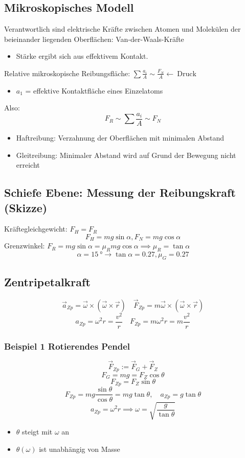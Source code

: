 \documentclass[a4paper]{scrartcl}
\renewcommand{\v}[1]{\vec{#1}}
\theoremstyle{definition}
\theoremstyle{plain}
\theoremstyle{plain}
\theoremstyle{remark}
\theoremstyle{remark}
\theoremstyle{remark}
\begin{document}
\subsection{Mikroskopisches Modell}
\label{sec-3-9}
Verantwortlich sind elektrische Kräfte zwischen Atomen und Molekülen der beieinander liegenden Oberflächen: Van-der-Waals-Kräfte
\begin{itemize}
\item Stärke ergibt sich aus effektivem Kontakt.
\end{itemize}
Relative mikroskopische Reibungsfläche: $\sum \frac{a_i}{A} \sim \frac{F_N}{A} \leftarrow~\text{Druck}$
\begin{itemize}
\item $a_1$ = effektive Kontaktfläche eines Einzelatoms
\end{itemize}
Also: \[F_R \sim \sum \frac{a_i}{A} \sim F_N\]
\begin{itemize}
\item Haftreibung: Verzahnung der Oberflächen mit minimalen Abstand
\item Gleitreibung: Minimaler Abstand wird auf Grund der Bewegung nicht erreicht
\end{itemize}
\subsection{Schiefe Ebene: Messung der Reibungskraft (Skizze)}
\label{sec-3-10}
Kräftegleichgewicht: $F_H = F_R$
\[F_H = m g \sin{\alpha}, F_N = m g \cos{\alpha}\]
Grenzwinkel: $F_R = m g \sin{\alpha} = \mu_R m g \cos{\alpha} \implies \mu_R = \tan{\alpha}$
\[\alpha = \SI{15}{\degree} \rightarrow \tan{\alpha} = 0.27,\mu_G = 0.27\]
\subsection{Zentripetalkraft}
\label{sec-3-11}
\[\v a_{Zp} = \v \omega \times(\v\omega\times\v r)\quad \v{F}_{Zp} = m\v\omega\times(\v\omega\times\v r)\]
\[a_{Zp} = \omega^2 r = \frac{v^2}{r}\quad F_{Zp} = m\omega^2 r = m \frac{v^2}{r}\]
\subsubsection{Beispiel 1 Rotierendes Pendel}
\label{sec-3-11-1}
\[\v{F}_{Zp} := \v{F}_G + \v{F}_Z\]
\[F_G = m g = F_Z \cos{\theta}\]
\[F_{Zp} = F_Z \sin{\theta}\]
\[F_{Zp} = mg \frac{\sin{\theta}}{\cos{\theta}} = m g \tan{\theta},\quad a_{Zp} = g\tan{\theta}\]
\[a_{Zp} = \omega^2 r \implies \omega = \sqrt{\frac{g}{\tan{\theta}}}\]
\begin{itemize}
\item $\theta$ steigt mit $\omega$ an
\item $\theta(\omega)$ ist unabhängig von Masse
\end{itemize}
\end{document}

